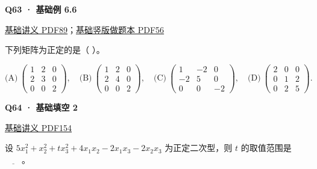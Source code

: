 \documentclass[UTF8,fontset=fandol,11pt,a4paper]{ctexart}
\newcommand{\source}[1]{{\footnotesize\color{Muted}#1\par}}
\newcommand{\qtitle}[2]{\par\needspace{5\baselineskip}\hypertarget{#1}{}\label{#1}\textbf{#2}\par}
\begin{document}
\begin{minipage}{\linewidth}
\qtitle{B-EX-06}{Q63 · 基础例 6.6}
\source{\href{file:///Users/skyintelligence/Desktop/\%E5\%BE\%97\%E8\%AF\%BB\%E4\%B8\%AA\%E7\%A0\%94-\%E5\%8C\%97\%E5\%A4\%A7\%E8\%BD\%AF\%E5\%BE\%AE/\%E6\%95\%B0\%E5\%AD\%A6\%20150/\%E8\%AE\%B2\%E4\%B9\%89/\%E3\%80\%90\%E4\%B8\%80\%E9\%AB\%98\%E6\%95\%B0Kira\%E3\%80\%9127\%E8\%80\%83\%E7\%A0\%94\%E7\%BA\%BF\%E4\%BB\%A3\%E5\%9F\%BA\%E7\%A1\%80\%E8\%AE\%B2\%E4\%B9\%89\%26\%E4\%B9\%A0\%E9\%A2\%98-\%E7\%94\%B5\%E5\%AD\%90\%E7\%89\%88.pdf\#page=89}{基础讲义 PDF89}；\href{file:///Users/skyintelligence/Desktop/\%E5\%BE\%97\%E8\%AF\%BB\%E4\%B8\%AA\%E7\%A0\%94-\%E5\%8C\%97\%E5\%A4\%A7\%E8\%BD\%AF\%E5\%BE\%AE/\%E6\%95\%B0\%E5\%AD\%A6\%20150/\%E8\%AE\%B2\%E4\%B9\%89/\%E3\%80\%90\%E7\%AB\%96\%E7\%89\%88\%E3\%80\%9127\%E8\%80\%83\%E7\%A0\%94Kira\%E7\%BA\%BF\%E4\%BB\%A3\%E5\%9F\%BA\%E7\%A1\%80\%E8\%AE\%B2\%E4\%B9\%89\%E5\%81\%9A\%E9\%A2\%98\%E6\%9C\%AC\%281\%29.pdf\#page=56}{基础竖版做题本 PDF56}}
下列矩阵为正定的是（ ）。

\[
\text{(A)}\ \begin{pmatrix}1&2&0\\2&3&0\\0&0&2\end{pmatrix},\quad
\text{(B)}\ \begin{pmatrix}1&2&0\\2&4&0\\0&0&2\end{pmatrix},\quad
\text{(C)}\ \begin{pmatrix}1&-2&0\\-2&5&0\\0&0&-2\end{pmatrix},\quad
\text{(D)}\ \begin{pmatrix}2&0&0\\0&1&2\\0&2&5\end{pmatrix}.
\]
\end{minipage}\par\vspace{7mm}
\begin{minipage}{\linewidth}
\qtitle{B-FB-02}{Q64 · 基础填空 2}
\source{\href{file:///Users/skyintelligence/Desktop/\%E5\%BE\%97\%E8\%AF\%BB\%E4\%B8\%AA\%E7\%A0\%94-\%E5\%8C\%97\%E5\%A4\%A7\%E8\%BD\%AF\%E5\%BE\%AE/\%E6\%95\%B0\%E5\%AD\%A6\%20150/\%E8\%AE\%B2\%E4\%B9\%89/\%E3\%80\%90\%E4\%B8\%80\%E9\%AB\%98\%E6\%95\%B0Kira\%E3\%80\%9127\%E8\%80\%83\%E7\%A0\%94\%E7\%BA\%BF\%E4\%BB\%A3\%E5\%9F\%BA\%E7\%A1\%80\%E8\%AE\%B2\%E4\%B9\%89\%26\%E4\%B9\%A0\%E9\%A2\%98-\%E7\%94\%B5\%E5\%AD\%90\%E7\%89\%88.pdf\#page=154}{基础讲义 PDF154}}
设 $5x_1^2+x_2^2+tx_3^2+4x_1x_2-2x_1x_3-2x_2x_3$ 为正定二次型，则 $t$ 的取值范围是 $\underline{\qquad}$。
\end{minipage}\par\vspace{7mm}
\end{document}
